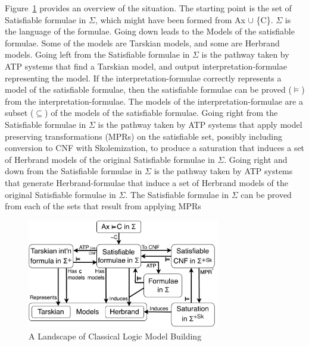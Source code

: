\documentclass{easychair}
\begin{document}
Figure~\ref{ModelLandscape} provides an overview of the situation.
The starting point is the set of {\sf Satisfiable formulae in $\Sigma$}, which might have been
formed from {\sf Ax $\cup$ \{{\raisebox{0.4ex}{\texttildelow}}C\}}. 
$\Sigma$ is the language of the formulae.
Going down leads to the {\sf Models} of the satisfiable formulae.
Some of the models are Tarskian models, and some are Herbrand models.
Going left from the {\sf Satisfiable formulae in $\Sigma$} is the pathway taken by ATP systems 
that find a Tarskian model, and output interpretation-formulae representing the model.
If the interpretation-formulae correctly represents a model of the satisfiable formulae, then
the satisfiable formulae can be proved ($\vDash$) from the interpretation-formulae.
The models of the interpretation-formulae are a subset ($\subseteq$) of the models of the
satisfiable formulae.
Going right from the {\sf Satisfiable formulae in $\Sigma$} is the pathway taken by ATP systems
that apply model preserving transformations ({\sf MPR}s) on the satisfiable set, possibly 
including conversion to CNF with Skolemization, to produce a saturation that induces a set of 
Herbrand models of the original {\sf Satisfiable formulae in $\Sigma$}.
Going right and down from the {\sf Satisfiable formulae in $\Sigma$} is the pathway taken by ATP 
systems that generate Herbrand-formulae that induce a set of Herbrand models of 
the original {\sf Satisfiable formulae in $\Sigma$}.
The {\sf Satisfiable formulae in $\Sigma$} can be proved from each of the sets that result from 
applying MPRs

\begin{figure}[htbp]
\centering
\includegraphics[width=0.75\textwidth]{ModelLandscape.pdf}
\caption{A Landscape of Classical Logic Model Building}
\label{ModelLandscape}
\end{figure}
\end{document}
